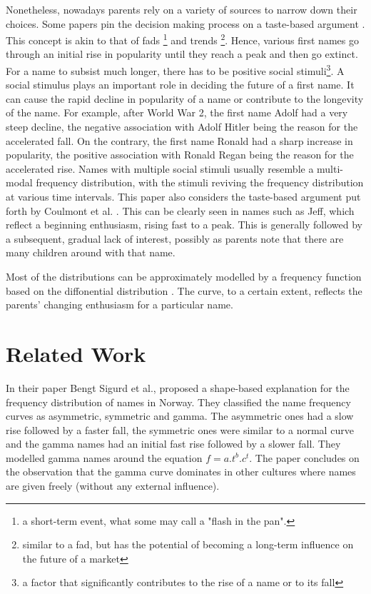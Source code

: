 \documentclass[letterpaper,12pt]{article}
\begin{document}
Nonetheless, nowadays parents rely on a variety of sources to narrow down their choices. Some papers pin the decision making process on a taste-based argument \cite{2}. This concept is akin to that of fads \footnote{a short-term event, what some may call a "flash in the pan".} and trends \footnote{similar to a fad, but has the potential of becoming a long-term influence on the future of a market}. Hence, various first names go through an initial rise in popularity until they reach a peak and then go extinct. For a name to subsist much longer, there has to be positive social stimuli\footnote{ a factor that significantly contributes to the rise of a name or to its fall }. A social stimulus plays an important role in deciding the future of a first name. It can cause the rapid decline in popularity of a name or contribute to the longevity of the name. For example, after World War 2, the first name Adolf had a very steep decline, the negative association with Adolf Hitler being the reason for the accelerated fall. On the contrary, the first name Ronald had a sharp increase in popularity, the positive association with Ronald Regan being the reason for the accelerated rise. Names with multiple social stimuli usually resemble a multi-modal frequency distribution, with the stimuli reviving the frequency distribution at various time intervals.
This paper also considers the taste-based argument put forth by Coulmont et al. \cite{3}. This can be clearly seen in names such as Jeff, which reflect a beginning enthusiasm, rising fast to a peak. This is generally followed by a subsequent, gradual lack of interest, possibly as parents note that there are many children around with that name.


Most of the distributions can be approximately modelled by a frequency function based on the diffonential distribution \cite{6}. The curve, to a certain extent, reflects the parents' changing enthusiasm for a particular name.
 
\section{Related Work}

In their paper \cite{7} Bengt Sigurd et al., proposed a shape-based explanation for the frequency distribution of names in Norway. They classified the name frequency curves as asymmetric, symmetric and gamma. The asymmetric ones had a slow rise followed by  
a faster fall, the symmetric ones were similar to a normal curve and the gamma names had an initial fast rise followed by a slower fall. They modelled gamma names around the equation $f = a.t^{b}.c^{t}$. The paper concludes on the observation that the gamma curve dominates in other cultures where names are given freely (without any external influence).\\
\end{document}
